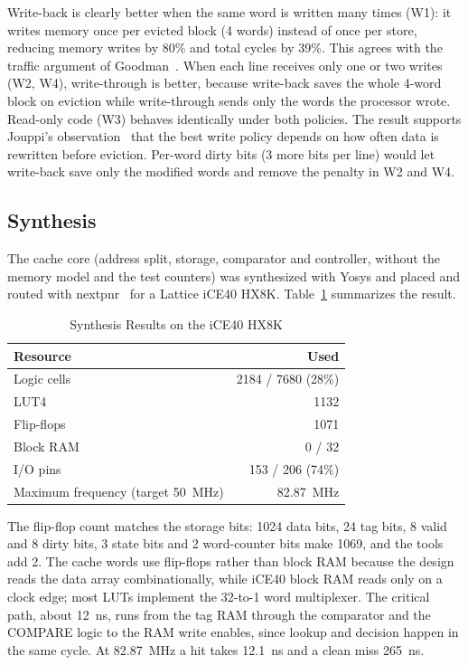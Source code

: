 \documentclass[conference]{IEEEtran}
\begin{document}
Write-back is clearly better when the same word is written many times (W1): it writes memory once per evicted block (4 words) instead of once per store, reducing memory writes by 80\% and total cycles by 39\%. This agrees with the traffic argument of Goodman~\cite{goodman1983}. When each line receives only one or two writes (W2, W4), write-through is better, because write-back saves the whole 4-word block on eviction while write-through sends only the words the processor wrote. Read-only code (W3) behaves identically under both policies. The result supports Jouppi's observation~\cite{jouppi1993} that the best write policy depends on how often data is rewritten before eviction. Per-word dirty bits (3 more bits per line) would let write-back save only the modified words and remove the penalty in W2 and W4.

\subsection{Synthesis}
The cache core (address split, storage, comparator and controller, without the memory model and the test counters) was synthesized with Yosys and placed and routed with nextpnr~\cite{shah2019} for a Lattice iCE40 HX8K. Table~\ref{tab:synth} summarizes the result.

\begin{table}[t]
\caption{Synthesis Results on the iCE40 HX8K}
\label{tab:synth}
\centering
\footnotesize
\begin{tabular}{@{}lr@{}}
\toprule
Resource & Used \\
\midrule
Logic cells & 2184 / 7680 (28\%) \\
LUT4 & 1132 \\
Flip-flops & 1071 \\
Block RAM & 0 / 32 \\
I/O pins & 153 / 206 (74\%) \\
Maximum frequency (target 50~MHz) & 82.87~MHz \\
\bottomrule
\end{tabular}
\end{table}

The flip-flop count matches the storage bits: 1024 data bits, 24 tag bits, 8 valid and 8 dirty bits, 3 state bits and 2 word-counter bits make 1069, and the tools add 2. The cache words use flip-flops rather than block RAM because the design reads the data array combinationally, while iCE40 block RAM reads only on a clock edge; most LUTs implement the 32-to-1 word multiplexer. The critical path, about 12~ns, runs from the tag RAM through the comparator and the COMPARE logic to the RAM write enables, since lookup and decision happen in the same cycle. At 82.87~MHz a hit takes 12.1~ns and a clean miss 265~ns.
\end{document}
